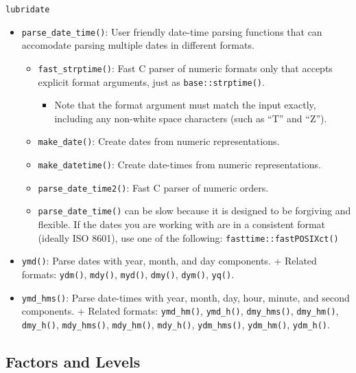 \documentclass[]{book}
\providecommand{\tightlist}{%
  \setlength{\itemsep}{0pt}\setlength{\parskip}{0pt}}
\theoremstyle{definition}
\theoremstyle{definition}
\theoremstyle{definition}
\theoremstyle{remark}
\begin{document}
\texttt{lubridate}

\begin{itemize}
\tightlist
\item
  \texttt{parse\_date\_time()}: User friendly date-time parsing
  functions that can accomodate parsing multiple dates in different
  formats.

  \begin{itemize}
  \tightlist
  \item
    \texttt{fast\_strptime()}: Fast C parser of numeric formats only
    that accepts explicit format arguments, just as
    \texttt{base::strptime()}.

    \begin{itemize}
    \tightlist
    \item
      Note that the format argument must match the input exactly,
      including any non-white space characters (such as ``T'' and
      ``Z'').
    \end{itemize}
  \item
    \texttt{make\_date()}: Create dates from numeric representations.
  \item
    \texttt{make\_datetime()}: Create date-times from numeric
    representations.
  \item
    \texttt{parse\_date\_time2()}: Fast C parser of numeric orders.
  \item
    \texttt{parse\_date\_time()} can be slow because it is designed to
    be forgiving and flexible. If the dates you are working with are in
    a consistent format (ideally ISO 8601), use one of the following:
    \texttt{fasttime::fastPOSIXct()}
  \end{itemize}
\item
  \texttt{ymd()}: Parse dates with year, month, and day components. +
  Related formats: \texttt{ydm()}, \texttt{mdy()}, \texttt{myd()},
  \texttt{dmy()}, \texttt{dym()}, \texttt{yq()}.
\item
  \texttt{ymd\_hms()}: Parse date-times with year, month, day, hour,
  minute, and second components. + Related formats: \texttt{ymd\_hm()},
  \texttt{ymd\_h()}, \texttt{dmy\_hms()}, \texttt{dmy\_hm()},
  \texttt{dmy\_h()}, \texttt{mdy\_hms()}, \texttt{mdy\_hm()},
  \texttt{mdy\_h()}, \texttt{ydm\_hms()}, \texttt{ydm\_hm()},
  \texttt{ydm\_h()}.
\end{itemize}

\subsection{Factors and Levels}\label{factors-and-levels}
\end{document}
